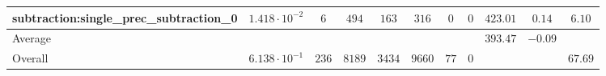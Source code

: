 \begin{tabular}{|l|c|c|c|c|c|c|c|c|c|c|}
subtraction:single\_prec\_subtraction\_0         & $ 1.418 \cdot 10^{-2} $ & $ 6      $ & $ 494  $ & $ 163  $ & $ 316   $ & $ 0  $ & $ 0 $ & $ 423.01      $ & $ 0.14    $ & $ 6.10    $ \\
\hline
Average                                          & $                     $ & $        $ & $      $ & $      $ & $       $ & $    $ & $   $ & $ 393.47      $ & $ -0.09   $ & $         $ \\
\hline
Overall                                          & $ 6.138 \cdot 10^{-1} $ & $ 236    $ & $ 8189 $ & $ 3434 $ & $ 9660  $ & $ 77 $ & $ 0 $ & $             $ & $         $ & $ 67.69   $ \\
\hline
\end{tabular}
